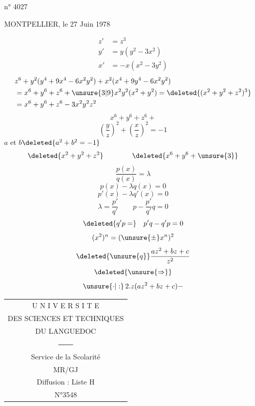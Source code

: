 n° 4027

MONTPELLIER, le 27 Juin 1978

\[
\begin{aligned}
z'&=z^3\\
y'&=y(y^2-3x^2)\\
x'&=-x(x^2-3y^2)
\end{aligned}
\]
\[
\begin{aligned}
&z^6+y^2(y^4+9x^4-6x^2y^2)+x^2(x^4+9y^4-6x^2y^2)\\
&=x^6+y^6+z^6+\unsure{3|9}x^2y^2(x^2+y^2)=\deleted{(x^2+y^2+z^2)^3}\\
&=x^6+y^6+z^6-3x^2y^2z^2
\end{aligned}
\]
\[x^6+y^6+z^6+\]
\[\left(\frac yz\right)^2+\left(\frac xz\right)^2=-1\]
$a$ et $b$\qquad $\deleted{a^2+b^2=-1}$
\[\deleted{x^2+y^2+z^2}\qquad\qquad\deleted{x^6+y^6+\unsure{3}}\]
\[
\frac{p(x)}{q(x)}=\lambda
\]
\[
p(x)-\lambda q(x)=0
\]
\[
p'(x)-\lambda q'(x)=0
\]
\[
\lambda=\frac{p'}{q'}\qquad p-\frac{p'}{q'}q=0
\]
\[
\deleted{q'p=}\quad p'q-q'p=0
\]
\[
(x^2)^n=(\unsure{\pm}x^n)^2
\]
\[
\deleted{\unsure{q}}\frac{az^2+bz+c}{z^2}
\]
\[
\deleted{\unsure{\Rightarrow}}
\]
\[
\unsure{\cdot|:}\,2.z(az^2+bz+c)-
\]

\begin{tabular}{c}
U N I V E R S I T E\\
DES SCIENCES ET TECHNIQUES\\
DU LANGUEDOC\\
\texttt{------------}\\
Service de la Scolarité\\
MR/GJ\\
Diffusion : Liste H\\
N°3548
\end{tabular}

